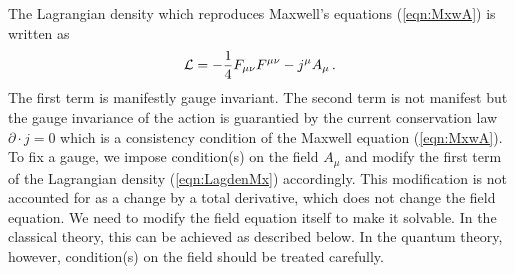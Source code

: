The Lagrangian density which
 reproduces Maxwell's equations (\ref{eqn:MxwA}) is written as
\begin{eqnarray}
{\cal L} = -\frac{1}{4}F_{\mu \nu} F^{\mu \nu} - j^\mu A_\mu
\,.
\label{eqn:LagdenMx}
\end{eqnarray}
The first term is manifestly gauge invariant.
The second term is not manifest but
the gauge invariance of the action is guarantied by the current conservation
law $\partial \cdot j = 0$ which is a consistency condition of the Maxwell equation
(\ref{eqn:MxwA}).
To fix a gauge, we impose condition(s) on the field $A_\mu$ and
modify the first term of the Lagrangian density (\ref{eqn:LagdenMx})
accordingly. This modification is not accounted for as a change by
a total derivative, which does not change the field equation.
We need to modify the field equation itself to make it solvable.
In the classical theory, this can be achieved as described below.
In the quantum theory, however, condition(s) on the field should
be treated carefully.

